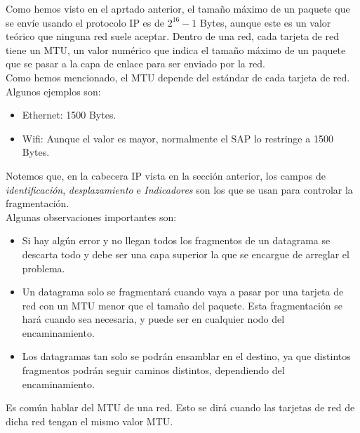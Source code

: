 Como hemos visto en el aprtado anterior, el tamaño máximo de un paquete que se envíe usando el protocolo \acrshort{IP} es de $2^{16}-1$ Bytes, aunque este es un valor teórico que ninguna red suele aceptar. 
Dentro de una red, cada tarjeta de red tiene un \acrfull{MTU}, un valor numérico que indica el tamaño máximo de un paquete que se pasar a la capa de enlace para ser enviado por la red.\\

Como hemos mencionado, el \acrshort{MTU} depende del estándar de cada tarjeta de red. Algunos ejemplos son:
\begin{itemize}
    \item Ethernet: 1500 Bytes.
    \item Wifi: Aunque el valor es mayor, normalmente el \acrshort{SAP} lo restringe a 1500 Bytes.
\end{itemize}

Notemos que, en la cabecera \acrshort{IP} vista en la sección anterior, los campos de \textit{identificación}, \textit{desplazamiento} e \textit{Indicadores} son los que se usan para controlar la fragmentación.\\

Algunas observaciones importantes son:
\begin{itemize}
    \item Si hay algún error y no llegan todos los fragmentos de un datagrama se descarta todo y debe ser una capa superior la que se encargue de arreglar el problema.
    \item Un datagrama solo se fragmentará cuando vaya a pasar por una tarjeta de red con un \acrshort{MTU} menor que el tamaño del paquete. Esta fragmentación se hará cuando sea necesaria, y puede ser en cualquier nodo del encaminamiento.
    \item Los datagramas tan solo se podrán ensamblar en el destino, ya que distintos fragmentos podrán seguir caminos distintos, dependiendo del encaminamiento.
\end{itemize}

\begin{observacion}
    Es común hablar del \acrshort{MTU} de una red. Esto se dirá cuando las tarjetas de red de dicha red tengan el mismo valor \acrshort{MTU}.
\end{observacion}

